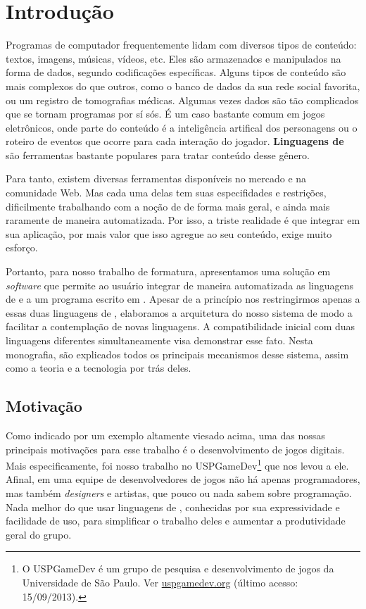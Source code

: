 
\chapter{Introdução}
\label{sec:intr}

Programas de computador frequentemente lidam com diversos tipos de conteúdo:
textos, imagens, músicas, vídeos, etc. Eles são armazenados e manipulados na
forma de dados, segundo codificações específicas. Alguns tipos de conteúdo são
mais complexos do que outros, como o banco de dados da sua rede social favorita,
ou um registro de tomografias médicas. Algumas vezes dados são tão
complicados que se tornam programas por sí sós. É um caso bastante comum em
jogos eletrônicos, onde parte do conteúdo é a inteligência artifical dos
personagens ou o roteiro de eventos que ocorre para cada interação do jogador.
\textbf{Linguagens de \script{}} são ferramentas bastante populares para tratar
conteúdo desse gênero.

Para tanto, existem diversas ferramentas disponíveis no mercado e na comunidade
Web. Mas cada uma delas tem suas especifidades e restrições, dificilmente
trabalhando com a noção de  de forma mais geral, e ainda mais
raramente de maneira automatizada. Por isso, a triste realidade é que integrar
 em sua aplicação, por mais valor que isso agregue ao seu conteúdo,
exige muito esforço.

Portanto, para nosso trabalho de formatura, apresentamos uma solução em
\textit{software} que permite ao usuário integrar de maneira automatizada as
linguagens de \script{}  e  a um programa escrito em
\CXX{}. Apesar de a princípio nos restringirmos apenas a essas duas linguagens
de \script{}, elaboramos a arquitetura do nosso sistema de modo a facilitar
a contemplação de novas linguagens. A compatibilidade inicial com duas
linguagens diferentes simultaneamente visa demonstrar esse fato. Nesta
monografia, são explicados todos os principais mecanismos desse sistema, assim
como a teoria e a tecnologia por trás deles.

\section{Motivação}
\label{sec:intr:motivacao}

Como indicado por um exemplo altamente viesado acima, uma das nossas principais
motivações para esse trabalho é o desenvolvimento de jogos digitais. Mais
especificamente, foi nosso trabalho no USPGameDev\footnote{
  O USPGameDev é um grupo de pesquisa e desenvolvimento de jogos da
  Universidade de São Paulo. Ver \url{uspgamedev.org} (último acesso: 
  15/09/2013).
} que nos levou a ele. Afinal, em uma equipe de desenvolvedores de jogos não
há apenas programadores, mas também \textit{designers} e artistas, que pouco
ou nada sabem sobre programação. Nada melhor do que usar linguagens de
\script{}, conhecidas por sua expressividade e facilidade de uso, para
simplificar o trabalho deles e aumentar a produtividade geral do grupo.


